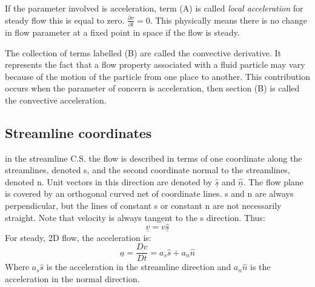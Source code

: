 \documentclass[class=report, crop=false, 12pt,a4paper]{standalone}
\begin{document}
If the parameter involved is acceleration, term (A) is called \emph{local acceleration} for steady flow this is equal to zero. \( \frac{\partial v}{\partial t} = 0 \). This physically means there is no change in flow parameter at a fixed point in space if the flow is steady. 

The collection of terms labelled (B) are called the convective derivative. It represents the fact that a flow property associated with a fluid particle may vary because of the motion of the particle from one place to another. This contribution occurs when the parameter of concern is acceleration, then section (B) is called the convective acceleration. 
\subsection{Streamline coordinates}
in the streamline C.S. the flow is described in terms of one coordinate along the streamlines, denoted s, and the second coordinate normal to the streamlines, denoted n. Unit vectors in this direction are denoted by \( \underline{\hat{s}} \) and \( \underline{\hat{n}} \). The flow plane is covered by an orthogonal curved net of coordinate lines. s and n are always perpendicular, but the lines of constant s or constant n are not necessarily straight. Note that velocity is always tangent to the s direction. Thus:
\begin{equation} 
  \underline{v} = v\underline{\hat{s}}
\end{equation}
For steady, 2D flow, the acceleration is:
\begin{equation} 
  \underline{a} = \frac{Dv}{Dt} = a_s \hat{s} + a_n \hat{n}
\end{equation}
Where \( a_s \hat{s} \) is the acceleration in the streamline direction and \( a_n \hat{n} \) is the acceleration in the normal direction. 
\end{document}
